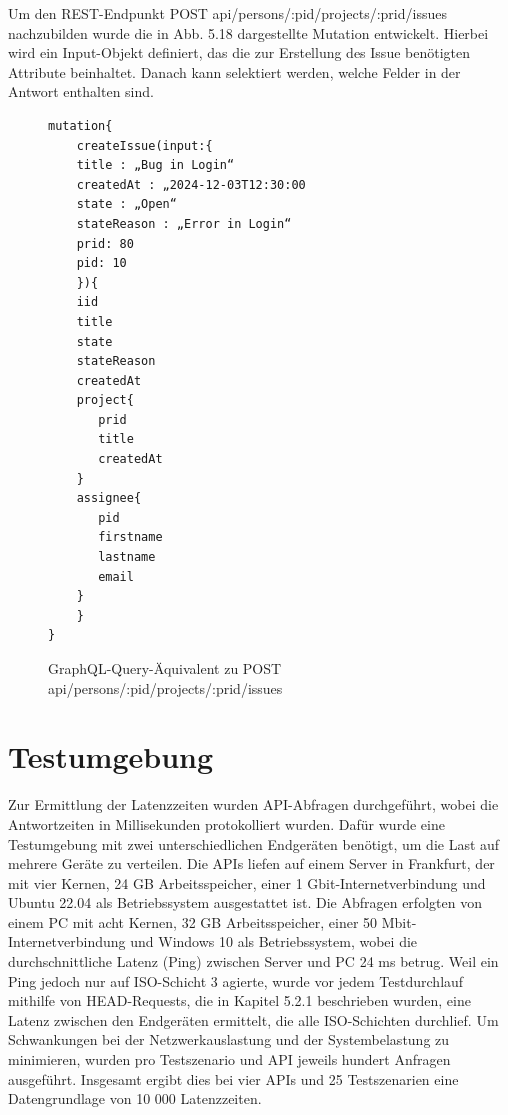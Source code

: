 \newpage
\noindent
Um den REST-Endpunkt \colorbox{gray!20}{POST api/persons/:pid/projects/:prid/issues} nachzubilden wurde die in Abb. 5.18 dargestellte Mutation entwickelt. Hierbei wird ein Input-Objekt definiert, das die zur Erstellung des Issue benötigten Attribute beinhaltet. Danach kann selektiert werden, welche Felder in der Antwort enthalten sind.
\begin{figure}[H]
\begin{center}
\begin{BVerbatim}
mutation{
    createIssue(input:{
	title : „Bug in Login“
	createdAt : „2024-12-03T12:30:00
	state : „Open“
	stateReason : „Error in Login“
	prid: 80
	pid: 10
	}){
	iid
	title
	state
	stateReason
	createdAt
	project{
	   prid
	   title
	   createdAt
	}
	assignee{
	   pid
	   firstname
	   lastname
	   email
	}
    }
}
\end{BVerbatim}
\end{center}
\caption{GraphQL-Query-Äquivalent zu POST api/persons/:pid/projects/:prid/issues}
\end{figure}

\label{sec:graphql}

\newpage
\section{Testumgebung} %
\label{sec:testumgebung}
Zur Ermittlung der Latenzzeiten wurden API-Abfragen durchgeführt, wobei die Antwortzeiten in Millisekunden protokolliert wurden. Dafür wurde eine Testumgebung mit zwei unterschiedlichen Endgeräten benötigt, um die Last auf mehrere Geräte zu verteilen. Die APIs liefen auf einem Server in Frankfurt, der mit vier Kernen, 24 GB Arbeitsspeicher, einer 1 Gbit-Internetverbindung und Ubuntu 22.04 als Betriebssystem ausgestattet ist.
\newline
Die Abfragen erfolgten von einem PC mit acht Kernen, 32 GB Arbeitsspeicher, einer 50 Mbit- Internetverbindung und Windows 10 als Betriebssystem, wobei die durchschnittliche Latenz (Ping) zwischen Server und PC 24 ms betrug. Weil ein Ping jedoch nur auf ISO-Schicht 3 agierte, wurde vor jedem Testdurchlauf mithilfe von HEAD-Requests, die in Kapitel 5.2.1 beschrieben wurden, eine Latenz zwischen den Endgeräten ermittelt, die alle ISO-Schichten durchlief. Um Schwankungen bei der Netzwerkauslastung und der Systembelastung zu minimieren, wurden pro Testszenario und API jeweils hundert Anfragen ausgeführt. Insgesamt ergibt dies bei vier APIs und 25 Testszenarien eine Datengrundlage von 10 000 Latenzzeiten.




